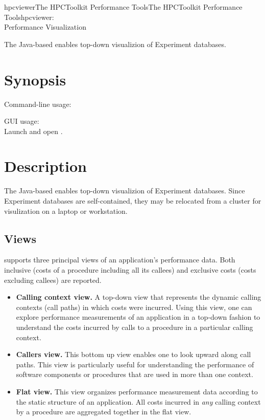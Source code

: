 \documentclass[english]{article}
\begin{document}
\begin{Name}{1}{hpcviewer}{The HPCToolkit Performance Tools}{The HPCToolkit Performance Tools}{hpcviewer:\\ Performance Visualization}

The Java-based  enables top-down visualizion of Experiment databases.

\end{Name}

\section{Synopsis}

 

Command-line usage:\\
 

GUI usage:\\
Launch  and open .

\section{Description}

The Java-based  enables top-down visualizion of Experiment databases.
Since Experiment databases are self-contained, they may be relocated from a cluster for visulization on a laptop or workstation.

\subsection{Views}

 supports three principal views of an application's performance data.  Both inclusive (costs of a procedure including all its callees) and exclusive costs (costs excluding callees) are reported.

\begin{itemize}
  \item \textbf{Calling context view.}
A top-down view that represents the dynamic calling contexts (call paths) in which costs were incurred.
Using this view, one can explore performance measurements of an application in a top-down fashion to understand the costs incurred by calls to a procedure in a particular calling context.

  \item \textbf{Callers view.}
This bottom up view enables one to look upward along call paths.
This view is particularly useful for understanding the performance of software components or procedures that are used in more than one context.

  \item \textbf{Flat view.}
This view organizes performance measurement data according to the static structure of an application.
All costs incurred in \emph{any} calling context by a procedure are aggregated together in the flat view.
\end{itemize}
\end{document}
